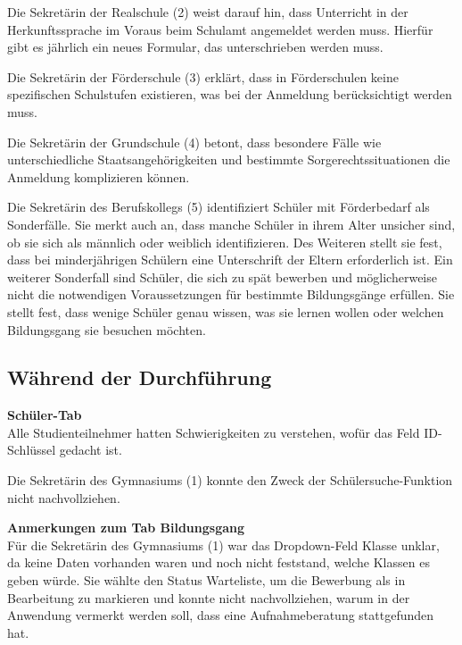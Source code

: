 Die Sekretärin der Realschule (2) weist darauf hin, dass Unterricht in der Herkunftssprache im Voraus beim Schulamt angemeldet werden muss. Hierfür gibt es jährlich ein neues Formular, das unterschrieben werden muss.

Die Sekretärin der Förderschule (3) erklärt, dass in Förderschulen keine spezifischen Schulstufen existieren, was bei der Anmeldung berücksichtigt werden muss.

Die Sekretärin der Grundschule (4) betont, dass besondere Fälle wie unterschiedliche Staatsangehörigkeiten und bestimmte Sorgerechtssituationen die Anmeldung komplizieren können.

Die Sekretärin des Berufskollegs (5) identifiziert Schüler mit Förderbedarf als Sonderfälle. Sie merkt auch an, dass manche Schüler in ihrem Alter unsicher sind, ob sie sich als männlich oder weiblich identifizieren. Des Weiteren stellt sie fest, dass bei minderjährigen Schülern eine Unterschrift der Eltern erforderlich ist. Ein weiterer Sonderfall sind Schüler, die sich zu spät bewerben und möglicherweise nicht die notwendigen Voraussetzungen für bestimmte Bildungsgänge erfüllen. Sie stellt fest, dass wenige Schüler genau wissen, was sie lernen wollen oder welchen Bildungsgang sie besuchen möchten.


\subsection{Während der Durchführung}

\textbf{\glqq Schüler\grqq{}-Tab}\\
Alle Studienteilnehmer hatten Schwierigkeiten zu verstehen, wofür das Feld \glqq ID-Schlüssel\grqq{} gedacht ist.

Die Sekretärin des Gymnasiums (1) konnte den Zweck der Schülersuche-Funktion nicht nachvollziehen.


\textbf{Anmerkungen zum Tab \glqq Bildungsgang\grqq{}}\\
Für die Sekretärin des Gymnasiums (1) war das Dropdown-Feld \glqq Klasse\grqq{} unklar, da keine Daten vorhanden waren und noch nicht feststand, welche Klassen es geben würde. Sie wählte den Status \glqq Warteliste\grqq{}, um die Bewerbung als \glqq in Bearbeitung\grqq{} zu markieren und konnte nicht nachvollziehen, warum in der Anwendung vermerkt werden soll, dass eine Aufnahmeberatung stattgefunden hat.

